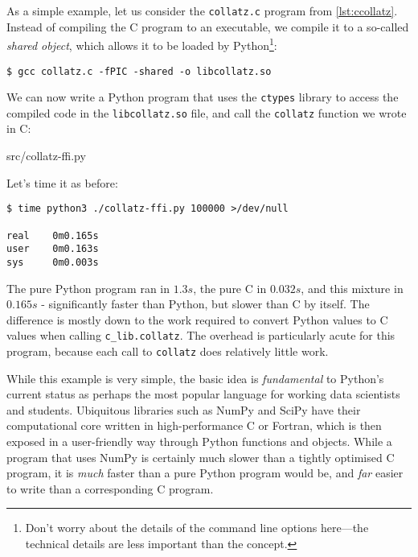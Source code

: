 As a simple example, let us consider the \texttt{collatz.c} program
from \cref{lst:ccollatz}.  Instead of compiling the C program to an
executable, we compile it to a so-called \textit{shared object}, which
allows it to be loaded by Python\footnote{Don't worry about the
  details of the command line options here---the technical details are
  less important than the concept.}:

\begin{lstlisting}
$ gcc collatz.c -fPIC -shared -o libcollatz.so
\end{lstlisting}

We can now write a Python program that uses the \texttt{ctypes}
library to access the compiled code in the \texttt{libcollatz.so}
file, and call the \texttt{collatz} function we wrote in C:


{src/collatz-ffi.py}

Let's time it as before:

\begin{lstlisting}
$ time python3 ./collatz-ffi.py 100000 >/dev/null

real    0m0.165s
user    0m0.163s
sys     0m0.003s
\end{lstlisting}

The pure Python program ran in $1.3s$, the pure C in $0.032s$, and
this mixture in $0.165s$ - significantly faster than Python, but
slower than C by itself.  The difference is mostly down to the work
required to convert Python values to C values when calling
\texttt{c\_lib.collatz}.  The overhead is particularly acute for this
program, because each call to \texttt{collatz} does relatively little
work.

While this example is very simple, the basic idea is
\textit{fundamental} to Python's current status as perhaps the most
popular language for working data scientists and students.  Ubiquitous
libraries such as NumPy and SciPy have their computational core
written in high-performance C or Fortran, which is then exposed in a
user-friendly way through Python functions and objects.  While a
program that uses NumPy is certainly much slower than a tightly
optimised C program, it is \textit{much} faster than a pure Python
program would be, and \textit{far} easier to write than a
corresponding C program.

